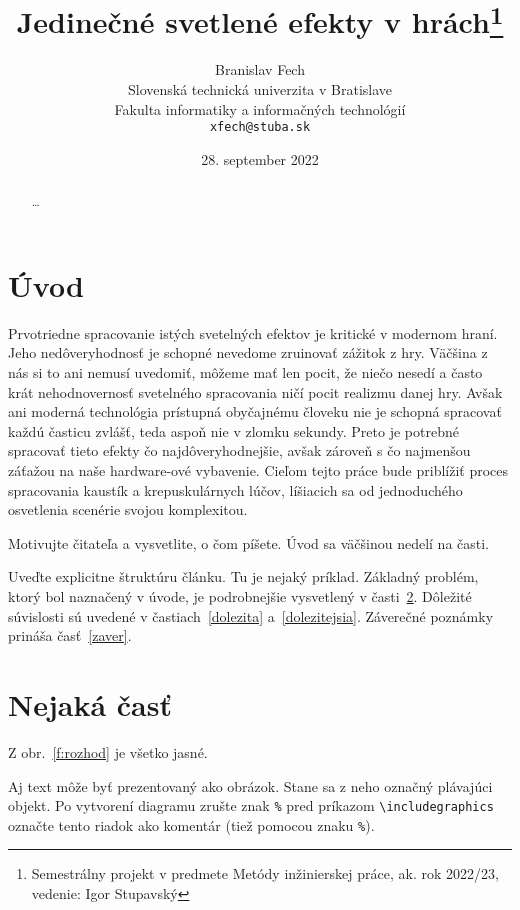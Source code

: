 \documentclass[10pt,twoside,slovak,a4paper]{article}
\title{Jedinečné svetlené efekty v hrách\thanks{Semestrálny projekt v predmete Metódy inžinierskej práce, ak. rok 2022/23, vedenie: Igor Stupavský}} %
\author{Branislav Fech\\[2pt]
	{\small Slovenská technická univerzita v Bratislave}\\
	{\small Fakulta informatiky a informačných technológií}\\
	{\small \texttt{xfech@stuba.sk}}
	}
\date{\small 28. september 2022} %
\begin{document}
\maketitle

\begin{abstract}
\ldots
\end{abstract}



\section{Úvod}

Prvotriedne spracovanie istých svetelných efektov je kritické v modernom hraní. 
Jeho nedôveryhodnosť je schopné nevedome zruinovať zážitok z hry. Väčšina z nás 
si to ani nemusí uvedomiť, môžeme mať len pocit, že niečo nesedí a často krát 
nehodnovernosť svetelného spracovania ničí pocit realizmu danej hry. Avšak ani 
moderná technológia prístupná obyčajnému človeku nie je schopná spracovať každú 
časticu zvlášť, teda aspoň nie v zlomku sekundy. Preto je potrebné spracovať 
tieto efekty čo najdôveryhodnejšie, avšak zároveň s čo najmenšou záťažou na 
naše hardware-ové vybavenie. Cieľom tejto práce bude priblížiť proces spracovania
kaustík a krepuskulárnych lúčov, líšiacich sa od jednoduchého osvetlenia scenérie 
svojou komplexitou.

Motivujte čitateľa a vysvetlite, o čom píšete. Úvod sa väčšinou nedelí na časti.

Uveďte explicitne štruktúru článku. Tu je nejaký príklad.
Základný problém, ktorý bol naznačený v úvode, je podrobnejšie vysvetlený v časti~\ref{nejaka}.
Dôležité súvislosti sú uvedené v častiach~\ref{dolezita} a~\ref{dolezitejsia}.
Záverečné poznámky prináša časť~\ref{zaver}.



\section{Nejaká časť} \label{nejaka}

Z obr.~\ref{f:rozhod} je všetko jasné. 

\begin{figure*}[tbh]
\centering
Aj text môže byť prezentovaný ako obrázok. Stane sa z neho označný plávajúci objekt. Po vytvorení diagramu zrušte znak \texttt{\%} pred príkazom \verb|\includegraphics| označte tento riadok ako komentár (tiež pomocou znaku \texttt{\%}).
\caption{Rozhodujúci argument.}
\label{f:rozhod}
\end{figure*}
\end{document}
